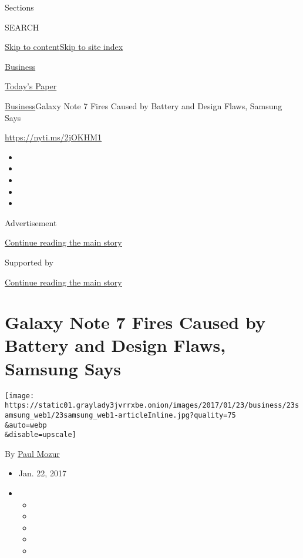Sections

SEARCH

\protect\hyperlink{site-content}{Skip to
content}\protect\hyperlink{site-index}{Skip to site index}

\href{https://www.nytimes3xbfgragh.onion/section/business}{Business}

\href{https://myaccount.nytimes3xbfgragh.onion/auth/login?response_type=cookie\&client_id=vi}{}

\href{https://www.nytimes3xbfgragh.onion/section/todayspaper}{Today's
Paper}

\href{/section/business}{Business}\textbar{}Galaxy Note 7 Fires Caused
by Battery and Design Flaws, Samsung Says

\url{https://nyti.ms/2jOKHM1}

\begin{itemize}
\item
\item
\item
\item
\item
\end{itemize}

Advertisement

\protect\hyperlink{after-top}{Continue reading the main story}

Supported by

\protect\hyperlink{after-sponsor}{Continue reading the main story}

\hypertarget{galaxy-note-7-fires-caused-by-battery-and-design-flaws-samsung-says}{%
\section{Galaxy Note 7 Fires Caused by Battery and Design Flaws, Samsung
Says}\label{galaxy-note-7-fires-caused-by-battery-and-design-flaws-samsung-says}}

\texttt{[image: https://static01.graylady3jvrrxbe.onion/images/2017/01/23/business/23samsung\_web1/23samsung\_web1-articleInline.jpg?quality=75\\\&auto=webp\\\&disable=upscale]}

By \href{https://www.nytimes3xbfgragh.onion/by/paul-mozur}{Paul Mozur}

\begin{itemize}
\item
  Jan. 22, 2017
\item
  \begin{itemize}
  \item
  \item
  \item
  \item
  \item
  \end{itemize}
\end{itemize}


